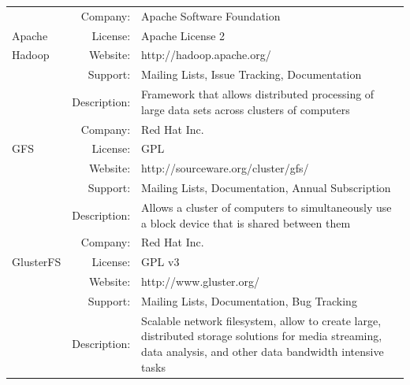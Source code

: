 \documentclass[a4paper, 12pt]{book}
\begin{document}
\begin{table}[H]
  \centering
  \begin{tabular}{ | m{2cm} | r  m{10cm} | }

  \hline        
		& Company: & Apache Software Foundation \\
     Apache	& License: & Apache License 2 \\
     Hadoop	& Website: & http://hadoop.apache.org/ \\
		& Support: & Mailing Lists, Issue Tracking, Documentation \\
	 	& Description: & Framework that allows distributed processing of large data sets across clusters of computers \\
    \hline        
		& Company: & Red Hat Inc. \\
      GFS	& License: & GPL \\
		& Website: & http://sourceware.org/cluster/gfs/ \\
		& Support: & Mailing Lists, Documentation, Annual Subscription \\
	 	& Description: & Allows a cluster of computers to simultaneously use a block device that is shared between them \\
    \hline
		& Company: & Red Hat Inc. \\
      GlusterFS & License: & GPL v3 \\
		& Website: & http://www.gluster.org/ \\
		& Support: & Mailing Lists, Documentation, Bug Tracking \\
	 	& Description: & Scalable network filesystem, allow to create large, distributed storage solutions for media streaming, data analysis, and other data bandwidth intensive tasks \\
    \hline

  \end{tabular}
\label{table:cluster_filesystems_1}
\end{table}
\end{document}
